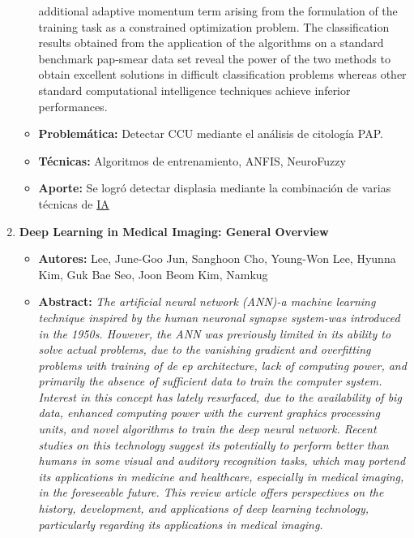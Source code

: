 \begin{enumerate}[label=\textbf{\arabic*}]
\begin{itemize}
{         additional adaptive momentum term 
         arising from the formulation of the training task as a constrained optimization problem. The classification 
         results obtained from the application of the algorithms on a standard benchmark pap-smear data set reveal 
         the power of the two methods to obtain excellent solutions in difficult classification problems whereas other
          standard computational intelligence techniques achieve inferior performances.}
        \item{\textbf{Problemática:}} Detectar CCU mediante el análisis de
        citología PAP.
        \item{\textbf{Técnicas:}} Algoritmos de entrenamiento, ANFIS, NeuroFuzzy
        \item{\textbf{Aporte:}} Se logró detectar displasia mediante la
        combinación de varias técnicas de  \hyperlink{abbr}{IA}
    \end{itemize}
    \item \textbf{Deep Learning in Medical Imaging: General Overview}~\cite{Lee2017}
    \begin{itemize} 
        \item{\textbf{Autores:}} Lee, June-Goo Jun, Sanghoon Cho, Young-Won Lee,
        Hyunna Kim, Guk Bae Seo, Joon Beom Kim, Namkug
        \item{\textbf{Abstract:}} \textit{The artificial neural network (ANN)-a machine 
        learning technique inspired by the human neuronal synapse system-was introduced in
         the 1950s. However, the ANN was previously limited in its ability to solve actual 
         problems, due to the vanishing gradient and overfitting problems with training of de
         ep architecture, lack of computing power, and primarily the absence of sufficient data
          to train the computer system. Interest in this concept has lately resurfaced, due to 
          the availability of big data, enhanced computing power with the current graphics processing
           units, and novel algorithms to train the deep neural network. Recent studies on this technology
           suggest its potentially to perform better than humans in some visual and auditory recognition 
           tasks, which may portend its applications in medicine and healthcare, especially in medical
            imaging, in the foreseeable future. This review article offers perspectives on the history, 
            development, and applications of deep learning technology, particularly regarding its 
            applications in medical imaging.}

\end{itemize}
\end{enumerate}
